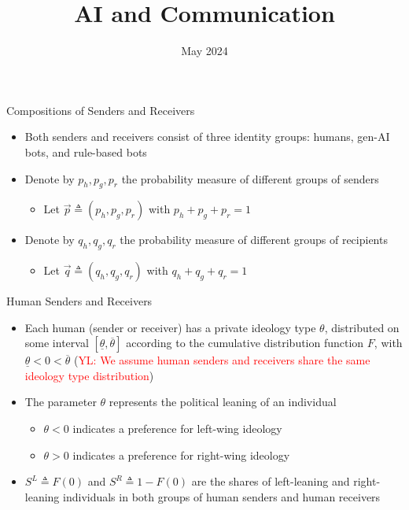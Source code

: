 \documentclass[9pt,aspectratio=1610]{beamer}
\author[Ash, Lou, Song]{%
    \texorpdfstring{%
    \begin{columns}
        \column{.3333\linewidth}
        \centering
        Elliot Ash \\\vspace{.5em} \small ETH Zurich
        \column{.3333\linewidth}
        \centering
        Yichuan Lou \\\vspace{.5em} \small UTokyo
        \column{.3333\linewidth}
        \centering
        Lena Song \\\vspace{.5em} \small UIUC
    \end{columns}}{Elliot Ash, Yichuan Lou, Lena Song}
}
\title[AI and Communication]{AI and Communication}
\date[Conference Name]{May 2024}
\begin{document}
\begin{frame}[plain]
    \titlepage
\end{frame}



\begin{frame}{Compositions of Senders and Receivers}

\begin{itemize}\setlength{\itemsep}{1em}
    \item Both senders and receivers consist of \textcolor{orange0}{three identity groups}: humans, gen-AI bots, and rule-based bots
    \item Denote by $p_h,p_g,p_r$ the probability measure of different groups of senders 
    \begin{itemize}
        \item Let $\vec{p} \triangleq (p_h,p_g,p_r)$ with $p_h+p_g+p_r=1$
    \end{itemize}
    \item Denote by $q_h,q_g,q_r$ the probability measure of different groups of recipients
    \begin{itemize}
        \item Let $\vec{q} \triangleq (q_h,q_g,q_r)$ with $q_h+q_g+q_r=1$
    \end{itemize}
\end{itemize}
\end{frame}

\begin{frame}{Human Senders and Receivers}

\begin{itemize}\setlength{\itemsep}{1em}
    \item Each human (sender or receiver) has a private ideology type $\theta$, distributed on some interval $[\underline{\theta},\overline{\theta}]$ according to the cumulative distribution function $F$, with $\underline{\theta}<0<\overline{\theta}$ (\textcolor{red}{YL: We assume human senders and receivers share the same ideology type distribution})
    \item The parameter $\theta$ represents the political leaning of an individual
    \begin{itemize}
        \item $\theta<0$ indicates a preference for left-wing ideology
        \item $\theta>0$ indicates a preference for right-wing ideology
    \end{itemize}
    \item $S^L \triangleq F(0)$ and $S^R\triangleq 1-F(0)$ are the shares of left-leaning and right-leaning individuals in both groups of human senders and human receivers
\end{itemize}
\end{frame}
\end{document}
